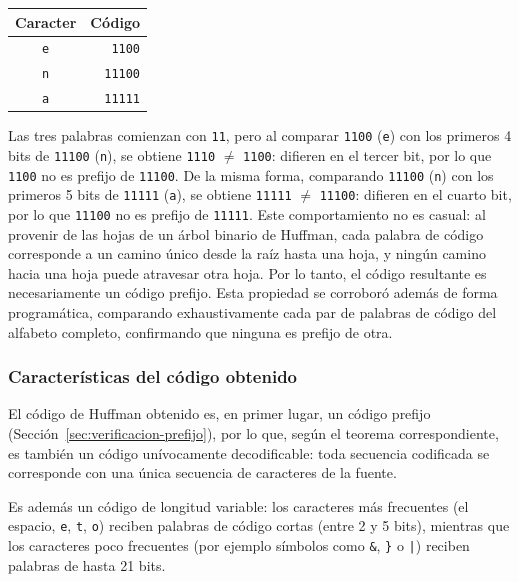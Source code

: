 \begin{center}
    \begin{tabular}{cr}
        \toprule
        Caracter & {Código} \\
        \midrule
        \texttt{e} & \texttt{1100} \\
        \texttt{n} & \texttt{11100} \\
        \texttt{a} & \texttt{11111} \\
        \bottomrule
    \end{tabular}
\end{center}

Las tres palabras comienzan con \texttt{11}, pero al comparar \texttt{1100} (\texttt{e}) con
los primeros 4 bits de \texttt{11100} (\texttt{n}), se obtiene \texttt{1110} $\neq$ \texttt{1100}:
difieren en el tercer bit, por lo que \texttt{1100} no es prefijo de \texttt{11100}. De la misma
forma, comparando \texttt{11100} (\texttt{n}) con los primeros 5 bits de \texttt{11111}
(\texttt{a}), se obtiene \texttt{11111} $\neq$ \texttt{11100}: difieren en el cuarto bit, por lo
que \texttt{11100} no es prefijo de \texttt{11111}. Este comportamiento no es casual: al provenir
de las hojas de un árbol binario de Huffman, cada palabra de código corresponde a un camino único
desde la raíz hasta una hoja, y ningún camino hacia una hoja puede atravesar otra hoja. Por lo
tanto, el código resultante es necesariamente un código prefijo. Esta propiedad se corroboró
además de forma programática, comparando exhaustivamente cada par de palabras de código del
alfabeto completo, confirmando que ninguna es prefijo de otra.

\subsubsection{Características del código obtenido}

El código de Huffman obtenido es, en primer lugar, un código prefijo
(Sección~\ref{sec:verificacion-prefijo}), por lo que, según el teorema correspondiente, es
también un código unívocamente decodificable: toda secuencia codificada se corresponde con una
única secuencia de caracteres de la fuente.

Es además un código de longitud variable: los caracteres más frecuentes (el espacio,
\texttt{e}, \texttt{t}, \texttt{o}) reciben palabras de código cortas (entre 2 y 5 bits),
mientras que los caracteres poco frecuentes (por ejemplo símbolos como \texttt{\&}, \verb|}|
o \texttt{|}) reciben palabras de hasta 21 bits.

